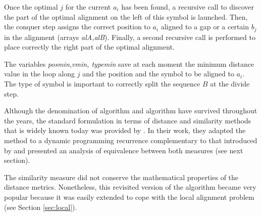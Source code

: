 Once the optimal $j$ for the current $a_i$ has been found, a recursive call to discover the part of the
optimal alignment on the left of this symbol is launched. Then, the conquer step assigns the correct 
position to $a_i$ aligned to a gap or a certain $b_j$ in the alignment (arrays \emph{alA,alB}). Finally, a 
second recursive call is performed to place correctly the right part of the optimal alignment.

The variables \emph{posmin,vmin, typemin} save at each moment the minimum distance value in the loop 
along $j$ and the position and the symbol to be aligned to $a_i$. The type of symbol is important to 
correctly split the sequence $B$ at the divide step.

\label{nwrevisited}
 

Although the denomination of \citeauthor{needleman:1970a} algorithm and \citeauthor{sellers:1974a} algorithm have 
survived throughout the years, the standard formulation in terms of distance and similarity methods that is 
widely known today was provided by \citet{smith:1981b}. In their work, they adapted the \citeauthor{needleman:1970a} 
method to a dynamic programming recurrence complementary to that introduced by \citeauthor{sellers:1974a} and 
presented an analysis of equivalence between both measures (see next section).

The similarity measure did not conserve the mathematical properties of the distance metrics. Nonetheless, 
this revisited version of the algorithm became very popular because it was easily extended to cope with 
the local alignment problem (see Section \ref{sec:local}).

